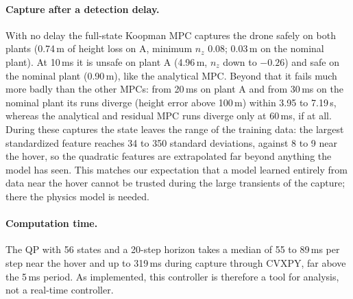 \paragraph{Capture after a detection delay.} With no delay the full-state Koopman MPC captures the drone safely on both plants (0.74\,m of height loss on A, minimum $n_z$ 0.08; 0.03\,m on the nominal plant). At 10\,ms it is unsafe on plant A (4.96\,m, $n_z$ down to $-0.26$) and safe on the nominal plant (0.90\,m), like the analytical MPC. Beyond that it fails much more badly than the other MPCs: from 20\,ms on plant A and from 30\,ms on the nominal plant its runs diverge (height error above 100\,m) within 3.95 to 7.19\,s, whereas the analytical and residual MPC runs diverge only at 60\,ms, if at all. During these captures the state leaves the range of the training data: the largest standardized feature reaches 34 to 350 standard deviations, against 8 to 9 near the hover, so the quadratic features are extrapolated far beyond anything the model has seen. This matches our expectation that a model learned entirely from data near the hover cannot be trusted during the large transients of the capture; there the physics model is needed.

\paragraph{Computation time.} The QP with 56 states and a 20-step horizon takes a median of 55 to 89\,ms per step near the hover and up to 319\,ms during capture through CVXPY, far above the 5\,ms period. As implemented, this controller is therefore a tool for analysis, not a real-time controller.
